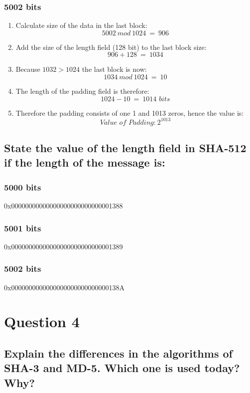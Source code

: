 \documentclass{report}
\begin{document}
			\subsubsection{5002 bits}
			\startsubsection
				\begin{enumerate}
					\item Calculate size of the data in the last block:
					\[
						5002 \ mod \ 1024 \ = \ 906
					\]
					\item Add the size of the length field (128 bit) to the last block size:
					\[
						906 + 128 \ = \ 1034
					\]
					\item Because $1032 > 1024$ the last block is now:
					\[
						1034 \ mod \ 1024 \ = \ 10
					\]
					\item The length of the padding field is therefore:
					\[
						1024 - 10 \ = \ 1014 \textit{ bits}
					\]
					\item Therefore the padding consists of one 1 and 1013 zeros, hence the value is:
					\[
						\textit{Value of Padding:} \ 2^{1013}
					\]
				\end{enumerate}
			\closesection
		\closesection
		\subsection{State the value of the length field in SHA-512 if the length of the message is:}
		\startsubsection
			\subsubsection{5000 bits}
			\startsubsection
				0x00000000000000000000000000001388
			\closesection
			\subsubsection{5001 bits}
			\startsubsection
				0x00000000000000000000000000001389
			\closesection
			\subsubsection{5002 bits}
			\startsubsection
				0x0000000000000000000000000000138A
			\closesection
		\closesection
	\closesection
	
	\section{Question 4}
	\startsection
		\renewcommand{\thesubsection}{\thesection.\Alph{subsection}}
		\subsection{Explain the differences in the algorithms of SHA-3 and MD-5. Which one is used today? Why?}
		\startsubsection
		\closesection
	\closesection
\end{document}
